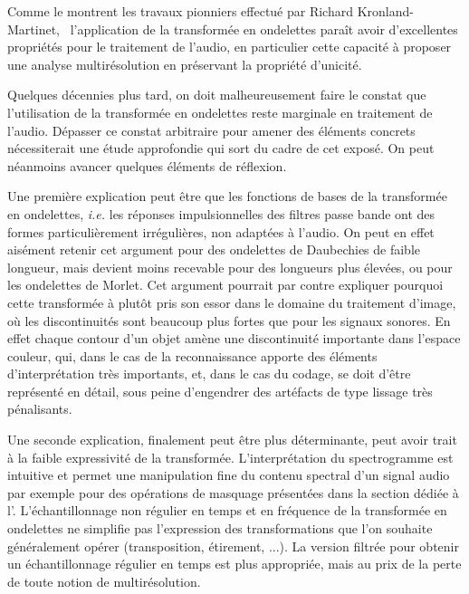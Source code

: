 Comme le montrent les travaux pionniers effectué par Richard Kronland-Martinet,~\cite{kronland1987analysis} l'application de la transformée en ondelettes paraît avoir d'excellentes propriétés pour le traitement de l'audio, en particulier cette capacité à proposer une analyse multirésolution en préservant la propriété d'unicité.



Quelques décennies plus tard, on doit malheureusement faire le constat que l'utilisation de la transformée en ondelettes reste marginale en traitement de l'audio. Dépasser ce constat arbitraire pour amener des éléments concrets nécessiterait une étude approfondie qui sort du cadre de cet exposé. On peut néanmoins avancer quelques éléments de réflexion.

Une première explication peut être que les fonctions de bases de la transformée en ondelettes, \textit{i.e.} les réponses impulsionnelles des filtres passe bande ont des formes particulièrement irrégulières, non adaptées à l'audio. On peut en effet aisément retenir cet argument pour des ondelettes de Daubechies de faible longueur, mais devient moins recevable pour des longueurs plus élevées, ou pour les ondelettes de Morlet. Cet argument pourrait par contre expliquer pourquoi cette transformée à plutôt pris son essor dans le domaine du traitement d'image, où les discontinuités sont beaucoup plus fortes que pour les signaux sonores. En effet chaque contour d'un objet amène une discontinuité importante dans l'espace couleur, qui, dans le cas de la reconnaissance apporte des éléments d'interprétation très importants, et, dans le cas du codage, se doit d'être représenté en détail, sous peine d'engendrer des artéfacts de type \og lissage \fg très pénalisants.

Une seconde explication, finalement peut être plus déterminante, peut avoir trait à la faible expressivité de la transformée. L'interprétation  du spectrogramme est intuitive et permet une manipulation fine du contenu spectral d'un signal audio par exemple pour des opérations de masquage présentées dans la section dédiée à l'. L'échantillonnage non régulier en temps et en fréquence de la transformée en ondelettes ne simplifie pas l'expression des transformations que l'on souhaite généralement opérer (transposition, étirement, ...). La version filtrée pour obtenir un échantillonnage régulier en temps est plus appropriée, mais au prix de la perte de toute notion de multirésolution.


